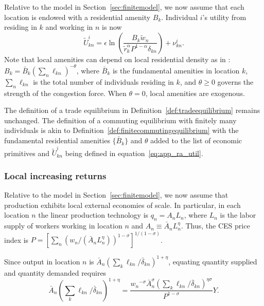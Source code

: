 \documentclass[11pt]{article}
\theoremstyle{definition}
\begin{document}
Relative to the model in Section~\ref{sec:finitemodel},
we now assume that each location is endowed with a residential amenity $B_k$.
Individual $i$'s utility from residing in $k$ and working in $n$ is now 
\begin{equation}\label{eq:app_ra_util}
    \tilde{U}_{kn}^{i} = \epsilon \ln\left(\frac{B_k \tilde{w}_n}{\tilde{r}_k^{\alpha}P^{1-\alpha} \delta_{kn}}\right) + \nu_{kn}^i
    .
\end{equation}
Note that local amenities can depend on local residential density as in :
$B_k = \bar{B}_k \left( \sum_n \ell_{kn} \right)^{-\theta}$,
where $\bar{B}_k$ is the fundamental amenities in location $k$, $\sum_n \ell_{kn}$ is the total number of individuals residing in $k$, and $\theta\geq 0$ governs the strength of the congestion force.
When $\theta = 0$, local amenities are exogenous. 


The definition of a trade equilibrium in Definition~\ref{def:tradeequilibrium} remains unchanged.
The definition of a commuting equilibrium with finitely many individuals is akin to Definition~\ref{def:finitecommutingequilibrium} with the fundamental residential amenities $\{\bar{B}_k\}$ and $\theta$ added to the list of economic primitives
and $\tilde{U}_{kn}^{i} $ being defined in equation~\eqref{eq:app_ra_util}.

\subsubsection{Local increasing returns}
\label{sec:appendix:local_inc_returns_theory}

Relative to the model in Section~\ref{sec:finitemodel},
we now assume that production exhibits local external economies of scale.
In particular, in each location $n$ the linear production technology is $q_n = A_n L_n$,
where $L_n$ is the labor supply of workers working in location $n$
and $A_n \equiv \bar{A}_n L_n^{\eta}$.
Thus, the CES price index is 
$P = \left[\sum_{n} \left(w_n/(\bar{A}_n L_n^{\eta})\right)^{1-\sigma}\right]^{1/(1-\sigma)}$.

Since output in location $n$ is $\bar{A}_n \left(\sum_k \ell_{kn}/\bar{\delta}_{kn}\right)^{1+\eta}$,
equating quantity supplied and quantity demanded requires
\begin{equation}\label{eqn:tradeeqlbm:goodsmarketclearing:localIR}
\bar{A}_n \left(\sum_k \ell_{kn}/\bar{\delta}_{kn}\right)^{1+\eta}
=
\frac{{w_n}^{-\sigma}\bar{A}_n^{\sigma} \left(\sum_k \ell_{kn}/\bar{\delta}_{kn}\right)^{\eta\sigma}}{P^{1-\sigma}} Y.
\end{equation}
\end{document}
